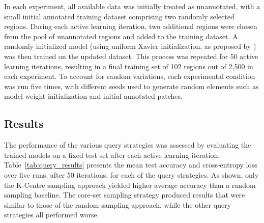 In each experiment, all available data was initially treated as unannotated, with a small initial annotated training dataset comprising two randomly selected regions. During each active learning iteration, two additional regions were chosen from the pool of unannotated regions and added to the training dataset. A randomly initialized model (using uniform Xavier initialization, as proposed by \cite{glorot2010understanding}) was then trained on the updated dataset. This process was repeated for 50 active learning iterations, resulting in a final training set of 102 regions out of 2,500 in each experiment. To account for random variations, each experimental condition was run five times, with different seeds used to generate random elements such as model weight initialization and initial annotated patches.

\subsection{Results}
\label{subsec:active_results}
The performance of the various query strategies was assessed by evaluating the trained models on a fixed test set after each active learning iteration. Table~\ref{tab:query_results} presents the mean test accuracy and cross-entropy loss over five runs, after 50 iterations, for each of the query strategies. As shown, only the K-Centre sampling approach yielded higher average accuracy than a random sampling baseline. The core-set sampling strategy produced results that were similar to those of the random sampling approach, while the other query strategies all performed worse.

\begin{table}[h]
	\centering
	\caption{Test results for each query strategy after 50 active iterations.}
	\label{tab:query_results}
\end{table}

